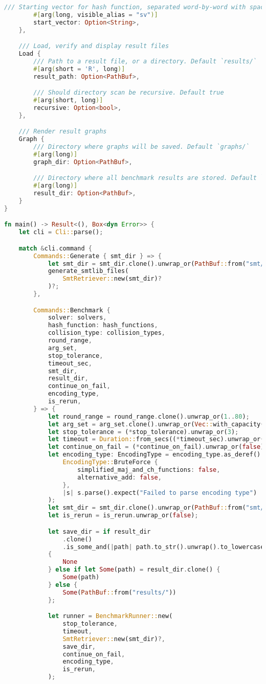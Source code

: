 \begin{lstlisting}[language=rust, caption={main.rs}]
		/// Starting vector for hash function, separated word-by-word with spaces. Default Initial Vector (IV)
		#[arg(long, visible_alias = "sv")]
		start_vector: Option<String>,
	},

	/// Load, verify and display result files
	Load {
		/// Path to a result file, or a directory. Default `results/`
		#[arg(short = 'R', long)]
		result_path: Option<PathBuf>,

		/// Should directory scan be recursive. Default true
		#[arg(short, long)]
		recursive: Option<bool>,
	},

	/// Render result graphs
	Graph {
		/// Directory where graphs will be saved. Default `graphs/`
		#[arg(long)]
		graph_dir: Option<PathBuf>,

		/// Directory where all benchmark results are stored. Default `results/`
		#[arg(long)]
		result_dir: Option<PathBuf>,
	}
}

fn main() -> Result<(), Box<dyn Error>> {
	let cli = Cli::parse();

	match &cli.command {
		Commands::Generate { smt_dir } => {
			let smt_dir = smt_dir.clone().unwrap_or(PathBuf::from("smt/"));
			generate_smtlib_files(
				SmtRetriever::new(smt_dir)?
			)?;
		},

		Commands::Benchmark {
			solver: solvers,
			hash_function: hash_functions,
			collision_type: collision_types,
			round_range,
			arg_set,
			stop_tolerance,
			timeout_sec,
			smt_dir,
			result_dir,
			continue_on_fail,
			encoding_type,
			is_rerun,
		} => {
			let round_range = round_range.clone().unwrap_or(1..80);
			let arg_set = arg_set.clone().unwrap_or(Vec::with_capacity(0));
			let stop_tolerance = (*stop_tolerance).unwrap_or(3);
			let timeout = Duration::from_secs((*timeout_sec).unwrap_or(15 * 60));
			let continue_on_fail = (*continue_on_fail).unwrap_or(false);
			let encoding_type: EncodingType = encoding_type.as_deref().map_or(
				EncodingType::BruteForce {
					simplified_maj_and_ch_functions: false,
					alternative_add: false,
				},
				|s| s.parse().expect("Failed to parse encoding type")
			);
			let smt_dir = smt_dir.clone().unwrap_or(PathBuf::from("smt/"));
			let is_rerun = is_rerun.unwrap_or(false);

			let save_dir = if result_dir
				.clone()
				.is_some_and(|path| path.to_str().unwrap().to_lowercase() == "none")
			{
				None
			} else if let Some(path) = result_dir.clone() {
				Some(path)
			} else {
				Some(PathBuf::from("results/"))
			};

			let runner = BenchmarkRunner::new(
				stop_tolerance,
				timeout,
				SmtRetriever::new(smt_dir)?,
				save_dir,
				continue_on_fail,
				encoding_type,
				is_rerun,
			);


\end{lstlisting}
